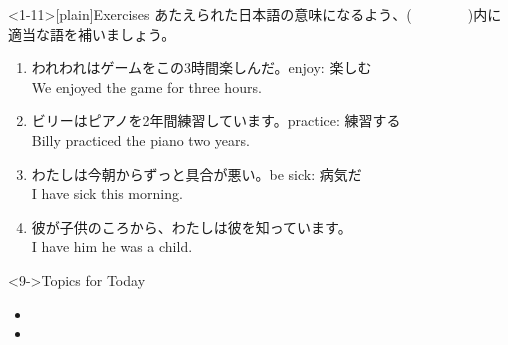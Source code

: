 \documentclass[aspectratio=169,xcolor={dvipsnames,table}]{beamer}
\begin{document}
\begin{frame}<1-11>[plain]{Exercises}
あたえられた日本語の意味になるよう、(~~~~~~~~)内に適当な語を補いましょう。

\begin{enumerate}
 \item われわれはゲームをこの3時間楽しんだ。\hfill{}{\small enjoy: 楽しむ}\\
We  enjoyed the game for three hours. \item ビリーはピアノを2年間練習しています。\hfill{}{\small practice: 練習する}\\
Billy  practiced the piano  two years.
 \item わたしは今朝からずっと具合が悪い。\hfill{}{\small be sick: 病気だ}\\
I have  sick  this morning.
 \item 彼が子供のころから、わたしは彼を知っています。\\
I have  him  he was a child.
\end{enumerate}

\begin{exampleblock}<9->{Topics for Today}\small
\begin{itemize}
 \item {}
 \item {}

\end{itemize}
      \end{exampleblock}

\end{frame}
\end{document}
